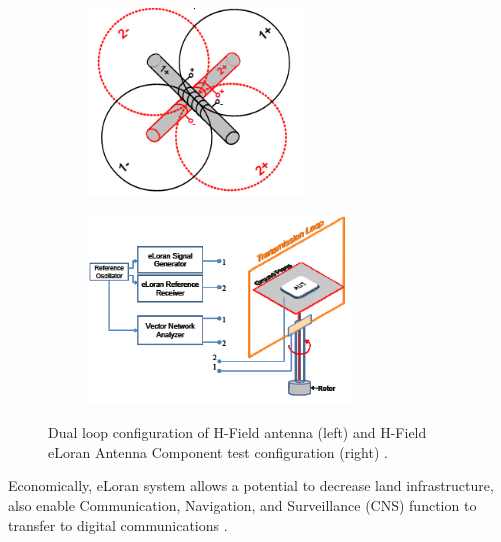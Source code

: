 \begin{figure}[!ht]
\centering
%    
  \begin{subfigure}[b]{0.45\textwidth}
    \includegraphics[height=5cm]{Figures/ELORAN_hfield_conf.PNG}
  \end{subfigure}
  \begin{subfigure}[b]{0.5\textwidth}
    \includegraphics[height=5cm]{Figures/ELORAN_hfield__antenna_component.PNG}
  \end{subfigure}
%  
  \caption{Dual loop configuration of H-Field antenna (left) and H-Field eLoran Antenna Component test configuration (right) \cite{BartoneH-fieldApplications}.}
    \label{fig:hloop antenna}
\end{figure}
\vspace{3mm}

\noindent Economically, eLoran system allows a potential to decrease land infrastructure, also enable Communication, Navigation, and Surveillance (CNS) function to transfer to digital communications \cite{InternationalLORANAssociation2007EnhancedApril}.\\